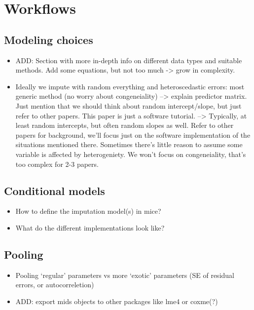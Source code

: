 \documentclass[
]{jss}
\begin{document}
\hypertarget{workflows}{%
\section{Workflows}\label{workflows}}

\hypertarget{modeling-choices}{%
\subsection{Modeling choices}\label{modeling-choices}}

\begin{itemize}
\item
  ADD: Section with more in-depth info on different data types and
  suitable methods. Add some equations, but not too much -\textgreater{}
  grow in complexity.
\item
  Ideally we impute with random everything and heteroscedastic errors:
  most generic method (no worry about congeneiality) --\textgreater{}
  explain predictor matrix. Just mention that we should think about
  random intercept/slope, but just refer to other papers. This paper is
  just a software tutorial. --\textgreater{} Typically, at least random
  intercepts, but often random slopes as well. Refer to other papers for
  background, we'll focus just on the software implementation of the
  situations mentioned there. Sometimes there's little reason to assume
  some variable is affected by heterogeniety. We won't focus on
  congeneiality, that's too complex for 2-3 papers.
\end{itemize}

\hypertarget{conditional-models}{%
\subsection{Conditional models}\label{conditional-models}}

\begin{itemize}
\item
  How to define the imputation model(s) in mice?
\item
  What do the different implementations look like?
\end{itemize}

\hypertarget{pooling}{%
\subsection{Pooling}\label{pooling}}

\begin{itemize}
\item
  Pooling `regular' parameters vs more `exotic' parameters (SE of
  residual errors, or autocorreletion)
\item
  ADD: export mids objects to other packages like lme4 or coxme(?)
\end{itemize}
\end{document}

